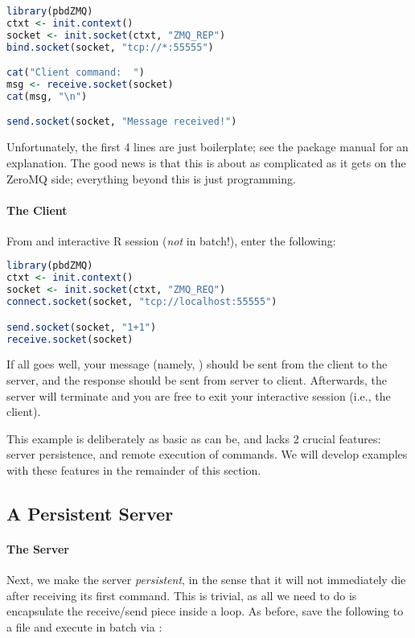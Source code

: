 \begin{lstlisting}[language=R,title=Server]
library(pbdZMQ)
ctxt <- init.context()
socket <- init.socket(ctxt, "ZMQ_REP")
bind.socket(socket, "tcp://*:55555")

cat("Client command:  ")
msg <- receive.socket(socket)
cat(msg, "\n")

send.socket(socket, "Message received!")
\end{lstlisting}

Unfortunately, the first 4 lines are just boilerplate; see the package manual
for an explanation.  The good news is that this is about as complicated as
it gets on the ZeroMQ side; everything beyond this is just 
programming.

\paragraph{The Client}
From and interactive R session (\emph{not} in batch!), enter the
following:

\begin{lstlisting}[language=R,title=Client]
library(pbdZMQ)
ctxt <- init.context()
socket <- init.socket(ctxt, "ZMQ_REQ")
connect.socket(socket, "tcp://localhost:55555")

send.socket(socket, "1+1")
receive.socket(socket)
\end{lstlisting}

If all goes well, your message (namely, ) should be sent from the
client to the server, and the response  should be 
sent from server to client.  Afterwards, the server will terminate and you are
free to exit your interactive  session (i.e., the client).  

This example is deliberately as basic as can be, and lacks 2 crucial
features:  server persistence, and remote execution of commands.  We will
develop examples with these features in the remainder of this section.




\subsection{A Persistent Server}

\paragraph{The Server}
Next, we make the server \emph{persistent}, in the sense that it will not
immediately die after receiving its first command.  This is trivial, as all
we need to do is encapsulate the receive/send piece inside a  loop.
As before, save the following to a file and execute in batch via :

